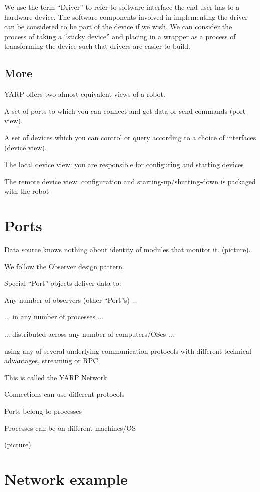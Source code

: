 We use the term ``Driver'' to refer to software interface the end-user
has to a hardware device.  The software components involved in
implementing the driver can be considered to be part of the device if
we wish.  We can consider the process of taking a ``sticky device''
and placing in a wrapper as a process of transforming the device such
that drivers are easier to build.


\subsection{More}


YARP offers two almost equivalent views of a robot.


A set of ports to which you can connect and get data or send commands
(port view).

A set of devices which you can control or query according to a choice
of interfaces (device view).

The local device view: you are responsible for configuring and starting devices

The remote device view: configuration and starting-up/shutting-down is
packaged with the robot



\section{Ports}

Data source knows nothing about identity of modules that monitor it.
(picture).

We follow the Observer design pattern. 

Special ``Port'' objects deliver data to:

Any number of observers (other ``Port''s) ...

... in any number of processes ...

... distributed across any number of computers/OSes ...

using any of several underlying communication protocols with different
technical advantages, streaming or RPC

This is called the YARP Network

Connections can use different protocols

Ports belong to processes

Processes can be on different machines/OS

(picture)

\section{Network example}

